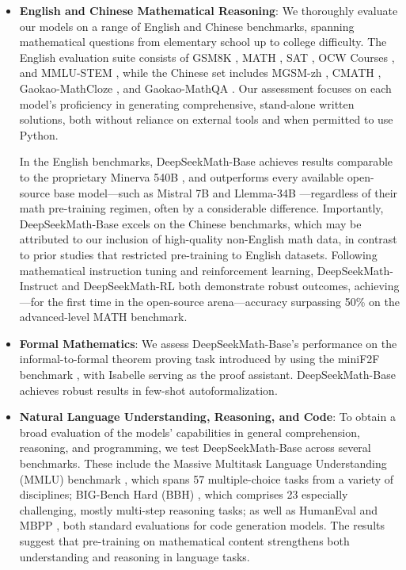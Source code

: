 \begin{itemize}[topsep=0pt]
    \item \textbf{English and Chinese Mathematical Reasoning}: We thoroughly evaluate our models on a range of English and Chinese benchmarks, spanning mathematical questions from elementary school up to college difficulty. The English evaluation suite consists of GSM8K \citep{gsm8k}, MATH \citep{MATH}, SAT \citep{llemma}, OCW Courses \citep{minerva}, and MMLU-STEM \citep{mmlu}, while the Chinese set includes MGSM-zh \citep{mgsm}, CMATH \citep{wei2023cmath}, Gaokao-MathCloze \citep{agieval}, and Gaokao-MathQA \citep{agieval}. Our assessment focuses on each model's proficiency in generating comprehensive, stand-alone written solutions, both without reliance on external tools and when permitted to use Python.

    In the English benchmarks, DeepSeekMath-Base achieves results comparable to the proprietary Minerva 540B \citep{minerva}, and outperforms every available open-source base model—such as Mistral 7B \citep{mistral} and Llemma-34B \citep{llemma}—regardless of their math pre-training regimen, often by a considerable difference. Importantly, DeepSeekMath-Base excels on the Chinese benchmarks, which may be attributed to our inclusion of high-quality non-English math data, in contrast to prior studies \citep{minerva,llemma} that restricted pre-training to English datasets. Following mathematical instruction tuning and reinforcement learning, DeepSeekMath-Instruct and DeepSeekMath-RL both demonstrate robust outcomes, achieving—for the first time in the open-source arena—accuracy surpassing 50\% on the advanced-level MATH benchmark.

\item \textbf{Formal Mathematics}: We assess DeepSeekMath-Base’s performance on the informal-to-formal theorem proving task introduced by \citep{dsp_proof} using the miniF2F benchmark \citep{minif2f}, with Isabelle \citep{isabelle} serving as the proof assistant. DeepSeekMath-Base achieves robust results in few-shot autoformalization.

\item \textbf{Natural Language Understanding, Reasoning, and Code}: To obtain a broad evaluation of the models’ capabilities in general comprehension, reasoning, and programming, we test DeepSeekMath-Base across several benchmarks. These include the Massive Multitask Language Understanding (MMLU) benchmark \citep{mmlu}, which spans 57 multiple-choice tasks from a variety of disciplines; BIG-Bench Hard (BBH) \citep{bbh}, which comprises 23 especially challenging, mostly multi-step reasoning tasks; as well as HumanEval \citep{codex} and MBPP \citep{mbpp}, both standard evaluations for code generation models. The results suggest that pre-training on mathematical content strengthens both understanding and reasoning in language tasks.


\end{itemize}
